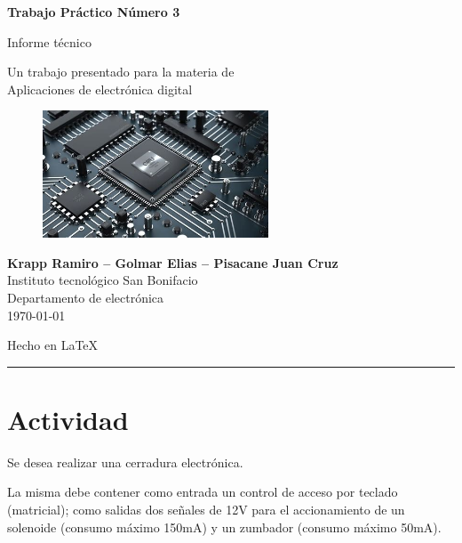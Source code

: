 \documentclass{article}
\begin{document}
\begin{titlepage}
	 \begin{center}
		 \vspace*{1cm}
				
		 {\Huge
		 \textbf{Trabajo Práctico Número 3}}
				
		 \vspace{0.3cm}
		 {\LARGE
		 Informe técnico	}
		 
		\vspace{0.5cm}
		 {\Large
		Un trabajo presentado para la materia de \\
		 Aplicaciones de electrónica digital}
				
		\vspace{1.5cm}
		 \begin{figure}[H]
		\includegraphics[width=0.6\textwidth]{logo}
		\centering
		\end{figure}
		\vfill
		 {\Large
		 \textbf{Krapp Ramiro -- Golmar Elias -- Pisacane Juan Cruz} \\
		 Instituto tecnológico San Bonifacio\\
		 Departamento de electrónica\\}
		 \today
		 
		 \vspace{0.5cm}
		 {\large Hecho en \LaTeX}

	 \end{center}
\end{titlepage}

\setcounter{tocdepth}{3}
\tableofcontents
\noindent\rule{\textwidth}{0.7pt}

\section{Actividad}
Se desea realizar una cerradura electrónica.

La misma debe contener como entrada un control de acceso por teclado (matricial);
como salidas dos señales de 12V para el accionamiento de un solenoide
(consumo máximo 150mA) y un zumbador (consumo máximo 50mA).
\end{document}
